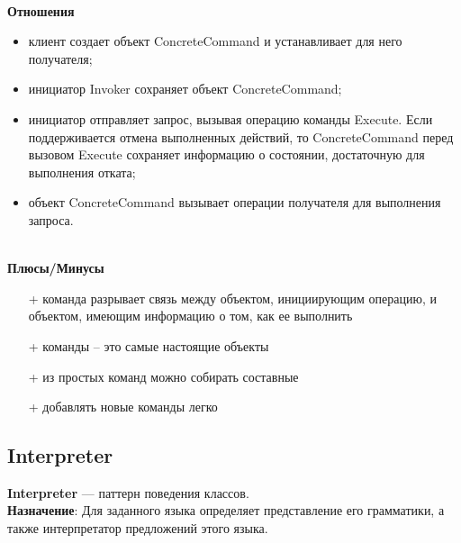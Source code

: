 \documentclass[a3paper,11pt]{report}
\begin{document}
\textbf{\\Отношения}
\begin{itemize}
\item клиент создает объект ConcreteCommand и устанавливает для него получателя;
\item инициатор Invoker сохраняет объект ConcreteCommand;
\item инициатор отправляет запрос, вызывая операцию команды Execute. Если поддерживается отмена выполненных действий, то ConcreteCommand перед вызовом Execute сохраняет информацию о состоянии, достаточную для выполнения отката;
\item объект ConcreteCommand вызывает операции получателя для выполнения запроса.
\end{itemize}

\textbf{\\Плюсы/Минусы}
\begin{itemize}
\item [+] команда разрывает связь между объектом, инициирующим операцию, и объектом, имеющим информацию о том, как ее выполнить
\item [+] команды – это самые настоящие объекты
\item [+] из простых команд можно собирать составные
\item [+] добавлять новые команды легко

\end{itemize}

\newpage
\subsection{Interpreter}

\large\textbf{Interpreter} --- паттерн поведения классов.
\\
\large\textbf{Назначение}: Для заданного языка определяет представление его грамматики, а также интерпретатор предложений этого языка.
\\
\end{document}
